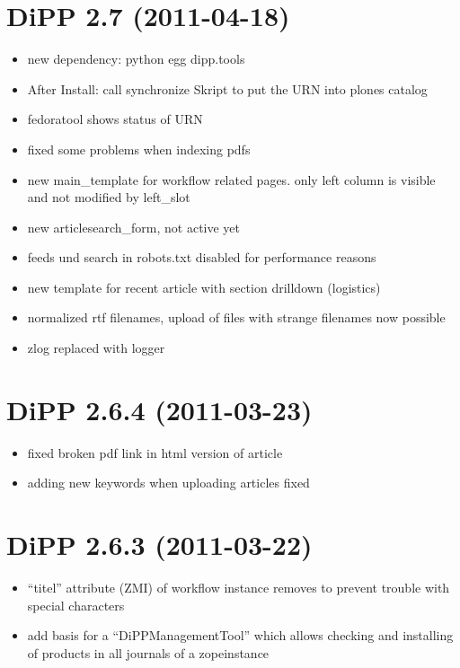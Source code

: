 \documentclass[a4paper,10pt,ngerman]{sphinxmanual}
\begin{document}
\section{DiPP 2.7 (2011-04-18)}
\label{changelog:dipp-2-7-2011-04-18}\begin{itemize}
\item {} 
new dependency: python egg dipp.tools

\item {} 
After Install: call synchronize Skript to put the URN into plones catalog

\item {} 
fedoratool shows status of URN

\item {} 
fixed some problems when indexing pdfs

\item {} 
new main\_template for workflow related pages. only left column is
visible and not modified by left\_slot

\item {} 
new articlesearch\_form, not active yet

\item {} 
feeds und search in robots.txt disabled for performance reasons

\item {} 
new template for recent article with section drilldown (logistics)

\item {} 
normalized rtf filenames, upload of files with strange filenames now
possible

\item {} 
zlog replaced with logger

\end{itemize}


\section{DiPP 2.6.4 (2011-03-23)}
\label{changelog:dipp-2-6-4-2011-03-23}\begin{itemize}
\item {} 
fixed broken pdf link in html version of article

\item {} 
adding new keywords when uploading articles fixed

\end{itemize}


\section{DiPP 2.6.3 (2011-03-22)}
\label{changelog:dipp-2-6-3-2011-03-22}\begin{itemize}
\item {} 
``titel'' attribute (ZMI) of workflow instance removes to prevent trouble
with special characters

\item {} 
add basis for a ``DiPPManagementTool'' which allows checking and
installing of products in all journals of a zopeinstance

\end{itemize}
\end{document}
